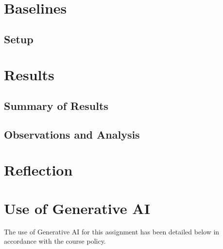 \documentclass[titlepage]{article}
\begin{document}
\section{Baselines}

\subsection{Setup}

\section{Results}

\subsection{Summary of Results}

\subsection{Observations and Analysis}

\section{Reflection}

\section{Use of Generative AI}
The use of Generative AI for this assignment has been detailed below in accordance with the course policy.
\end{document}
